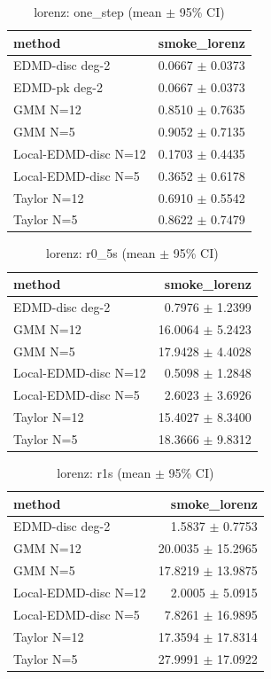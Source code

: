 \begin{table}[h]\centering
\small
\caption{lorenz: one_step (mean $\pm$ 95\% CI)}
\begin{tabular}{lr}
\toprule
method & smoke\_lorenz \\
\midrule
EDMD-disc deg-2 & 0.0667 $\pm$ 0.0373 \\
EDMD-pk deg-2 & 0.0667 $\pm$ 0.0373 \\
GMM N=12 & 0.8510 $\pm$ 0.7635 \\
GMM N=5 & 0.9052 $\pm$ 0.7135 \\
Local-EDMD-disc N=12 & 0.1703 $\pm$ 0.4435 \\
Local-EDMD-disc N=5 & 0.3652 $\pm$ 0.6178 \\
Taylor N=12 & 0.6910 $\pm$ 0.5542 \\
Taylor N=5 & 0.8622 $\pm$ 0.7479 \\
\bottomrule
\end{tabular}
\end{table}

\begin{table}[h]\centering
\small
\caption{lorenz: r0_5s (mean $\pm$ 95\% CI)}
\begin{tabular}{lr}
\toprule
method & smoke\_lorenz \\
\midrule
EDMD-disc deg-2 & 0.7976 $\pm$ 1.2399 \\
GMM N=12 & 16.0064 $\pm$ 5.2423 \\
GMM N=5 & 17.9428 $\pm$ 4.4028 \\
Local-EDMD-disc N=12 & 0.5098 $\pm$ 1.2848 \\
Local-EDMD-disc N=5 & 2.6023 $\pm$ 3.6926 \\
Taylor N=12 & 15.4027 $\pm$ 8.3400 \\
Taylor N=5 & 18.3666 $\pm$ 9.8312 \\
\bottomrule
\end{tabular}
\end{table}

\begin{table}[h]\centering
\small
\caption{lorenz: r1s (mean $\pm$ 95\% CI)}
\begin{tabular}{lr}
\toprule
method & smoke\_lorenz \\
\midrule
EDMD-disc deg-2 & 1.5837 $\pm$ 0.7753 \\
GMM N=12 & 20.0035 $\pm$ 15.2965 \\
GMM N=5 & 17.8219 $\pm$ 13.9875 \\
Local-EDMD-disc N=12 & 2.0005 $\pm$ 5.0915 \\
Local-EDMD-disc N=5 & 7.8261 $\pm$ 16.9895 \\
Taylor N=12 & 17.3594 $\pm$ 17.8314 \\
Taylor N=5 & 27.9991 $\pm$ 17.0922 \\
\bottomrule
\end{tabular}
\end{table}
